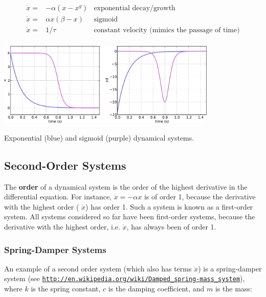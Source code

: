 {\itshape  \begin{eqnarray*} \dot{x} =& -\alpha (x-x^g) & \mbox{exponential decay/growth} \label{equ_}\\ \dot{x} =& \alpha x (\beta-x) & \mbox{sigmoid} \label{equ_}\\ \dot{x} =& 1/\tau & \mbox{constant velocity (mimics the passage of time)} \label{equ_}\\ \end{eqnarray*}}

{\itshape 
\begin{DoxyImage}
\includegraphics[height=4cm]{sigmoid-svg}
\caption{Exponential (blue) and sigmoid (purple) dynamical systems.}
\end{DoxyImage}
}

{\itshape }\hypertarget{page_dyn_sys_dyn_sys_second_order_systems}{}\subsection{Second-\/\+Order Systems}\label{page_dyn_sys_dyn_sys_second_order_systems}
The {\bfseries order} of a dynamical system is the order of the highest derivative in the differential equation. For instance, $\dot{x} = -\alpha x$ is of order 1, because the derivative with the highest order ( $\dot{x}$) has order 1. Such a system is known as a first-\/order system. All systems considered so far have been first-\/order systems, because the derivative with the highest order, i.\+e. $ \dot{x} $, has always been of order 1.\hypertarget{page_dyn_sys_dyn_sys_spring_damper}{}\subsubsection{Spring-\/\+Damper Systems}\label{page_dyn_sys_dyn_sys_spring_damper}
An example of a second order system (which also has terms $ \ddot{x} $) is a spring-\/damper system (see \href{http://en.wikipedia.org/wiki/Damped_spring-mass_system}{\tt http\+://en.\+wikipedia.\+org/wiki/\+Damped\+\_\+spring-\/mass\+\_\+system}), where $k$ is the spring constant, $c$ is the damping coefficient, and $m$ is the mass\+:

